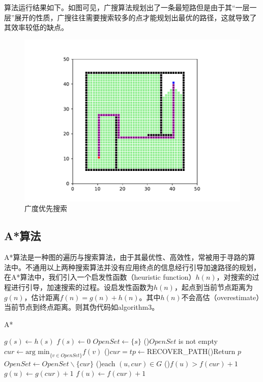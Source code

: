 \documentclass[12pt]{article}
\begin{document}
    \pagebreak
    算法运行结果如下。如图可见，广搜算法规划出了一条最短路但是由于其“一层一层”展开的性质，广搜往往需要搜索较多的点才能规划出最优的路径，这就导致了其效率较低的缺点。

    \begin{figure}[h]
        \centering
        \includegraphics[scale=0.7]{./fig/bfs.pdf}
        \caption{广度优先搜索}
    \end{figure}

    \subsection{A*算法}
    A*算法是一种图的遍历与搜索算法，由于其最优性、高效性，常被用于寻路的算法中。不通用以上两种搜索算法并没有应用终点的信息经行引导加速路径的规划，在A*算法中，我们引入一个启发性函数（heuristic function）$h(n)$，对搜索的过程进行引导，加速搜索的过程。设启发性函数为$h(n)$，起点到当前节点距离为$g(n)$，估计距离$f(n)=g(n)+h(n)$。其中$h(n)$不会高估（overestimate）当前节点到终点距离。则其伪代码如algorithm3。

    \begin{algorithm}[H]
        \caption{A*}
        $g(s) \gets h(s)$\;
        $f(s) \gets 0$\;
        $OpenSet \gets \{s\}$\;
        \While(){$OpenSet$ is not empty}{
            $cur \gets \text{arg min}_{\{v \in OpenSet\}} f(v)$\;
            \If(){$cur=t$}{$p \gets $RECOVER\_PATH()\;Return $p$\;}
            $OpenSet \gets OpenSet\backslash \{cur\}$\;
            \For(){each $(u,cur) \in G$}{
                \If(){$f(u)>f(cur)+1$}{
                    $g(u) \gets g(cur)+1$\;
                    $f(u) \gets f(cur)+1$\;
                }
            }
        }
    \end{algorithm}
    
\end{document}
